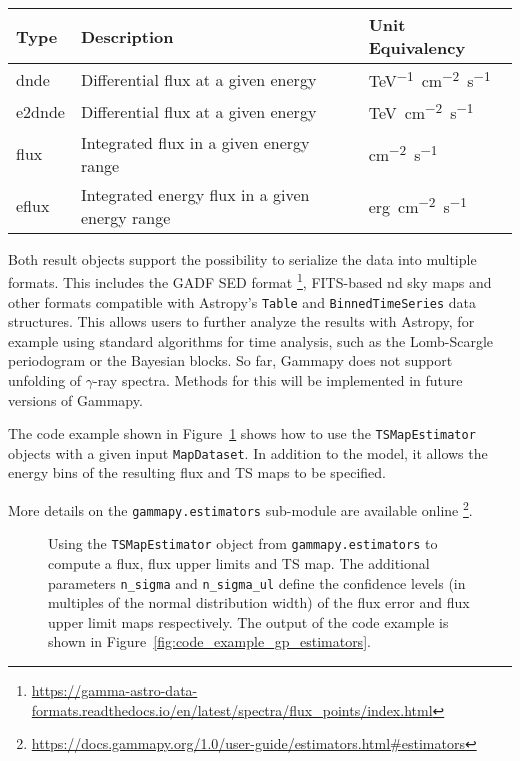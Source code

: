 \documentclass[longauth]{aa}
\newcommand{\code}[1]{\texttt{#1}}
\newcommand{\gammapy}{Gammapy\xspace}
\newcommand{\gammaray}{$\gamma$-ray\xspace}
\newcommand{\gadf}{GADF\xspace}
\begin{document}
\begin{table*}
    \begin{center}
        \begin{tabular}{lll}
         \hline
         Type & Description & Unit Equivalency \\
         \hline
         dnde & Differential flux at a given energy & \si{TeV^{-1}.cm^{-2}.s^{-1}} \\
         e2dnde & Differential flux at a given energy  & \si{TeV.cm^{-2}.s^{-1}} \\
         flux & Integrated flux in a given energy range & \si{cm^{-2}.s^{-1}} \\
         eflux & Integrated energy flux in a given energy range & \si{erg.cm^{-2}.s^{-1}}\\
         \hline
        \end{tabular}
    \end{center}
    \caption{Definition of the different SED types supported in \gammapy.}
    \label{tab:sed_types}
\end{table*}


Both result objects support the possibility to serialize
the data into multiple formats. This includes the
\gadf SED format \footnote{\url{https://gamma-astro-data-formats.readthedocs.io/en/latest/spectra/flux_points/index.html}},
FITS-based nd sky maps and other formats compatible with Astropy's \code{Table} and
\code{BinnedTimeSeries} data structures. This allows
users to further analyze the results with Astropy, for example using
standard algorithms for time analysis, such as
the Lomb-Scargle periodogram or the Bayesian
blocks. So far, \gammapy does not support unfolding of \gammaray spectra.
Methods for this will be implemented in future versions of \gammapy.

The code example shown in Figure~\ref{fig*:minted:gp_estimators} shows how to use
the \code{TSMapEstimator} objects with a given input \code{MapDataset}.
In addition to the model, it allows the energy
bins of the resulting flux and TS maps to be specified.

More details on the \code{gammapy.estimators} sub-module are available online \footnote{\url{https://docs.gammapy.org/1.0/user-guide/estimators.html\#estimators}}.

\begin{figure}
        \small
        \caption{Using the \code{TSMapEstimator} object from \code{gammapy.estimators} to compute a
         flux, flux upper limits and TS map. The additional parameters \code{n\_sigma}
        and \code{n\_sigma\_ul} define the confidence levels (in multiples of the normal distribution width)
        of the flux error and flux upper limit maps respectively. The output
                of the code example is shown in Figure~\ref{fig:code_example_gp_estimators}.
    }
    \label{fig*:minted:gp_estimators}
\end{figure}
\end{document}
